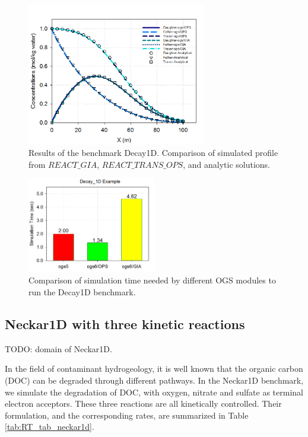\begin{figure}
\includegraphics[width=0.7\textwidth]{RT/figs/RT_fig_decay1d_results}
\caption{Results of the benchmark Decay1D. Comparison of simulated profile from $REACT\_GIA$, $REACT\_TRANS\_OPS$, and analytic solutions. }
\label{fig:RT_fig_decay1d_results}
\end{figure}

\begin{figure}
\includegraphics[width=0.5\textwidth]{RT/figs/RT_fig_decay1d_performance}
\caption{Comparison of simulation time needed by different OGS modules to run the Decay1D benchmark. }
\label{fig:RT_fig_decay1d_performance}
\end{figure}

\subsection{Neckar1D with three kinetic reactions}

TODO: domain of Neckar1D. 

In the field of contaminant hydrogeology, it is well known that the organic carbon (DOC) can be degraded through different pathways. In the Neckar1D benchmark, we simulate the degradation of DOC, with oxygen, nitrate and sulfate as terminal electron acceptors. These three reactions are all kinetically controlled. Their formulation, and the corresponding rates, are summarized in Table \ref{tab:RT_tab_neckar1d}. 

